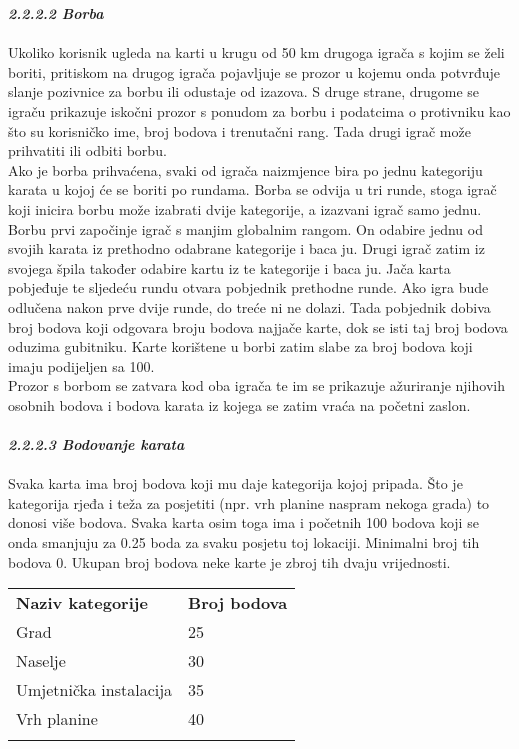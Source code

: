 		\textbf{\textit{\small2.2.2.2 Borba}}\\ \\
		{ Ukoliko korisnik ugleda na karti u krugu od 50 km drugoga igrača s kojim se želi boriti, pritiskom na drugog igrača pojavljuje se prozor u kojemu onda potvrđuje slanje pozivnice za borbu ili odustaje od izazova. S druge strane, drugome se  igraču prikazuje iskočni prozor s ponudom za borbu i podatcima o protivniku kao što su korisničko ime, broj bodova i trenutačni rang. Tada drugi igrač može prihvatiti ili odbiti borbu. \\ Ako je borba prihvaćena, svaki od igrača naizmjence bira po jednu kategoriju karata u kojoj će se boriti po rundama. Borba se odvija u tri runde, stoga igrač koji inicira borbu može izabrati dvije kategorije, a izazvani igrač samo jednu. Borbu prvi započinje igrač s manjim globalnim rangom. On odabire jednu od svojih karata iz prethodno odabrane kategorije i baca ju. Drugi igrač zatim iz svojega špila također odabire kartu iz te kategorije i baca ju. Jača karta pobjeđuje te sljedeću rundu otvara pobjednik prethodne runde. Ako igra bude odlučena nakon prve dvije runde, do treće ni ne dolazi. Tada pobjednik dobiva broj bodova koji odgovara broju bodova najjače karte, dok se isti taj broj bodova oduzima gubitniku. Karte korištene u borbi zatim slabe za broj bodova koji imaju podijeljen sa 100.\\ Prozor s borbom se zatvara kod oba igrača te im se prikazuje ažuriranje njihovih osobnih bodova i bodova karata iz kojega se zatim vraća na početni zaslon.} \\ \\
		
		
		\textbf{\textit{\small2.2.2.3 Bodovanje karata}}\\ \\
		{Svaka karta ima broj bodova koji mu daje kategorija kojoj pripada. Što je kategorija rjeđa i teža za posjetiti (npr. vrh planine naspram nekoga grada) to donosi više bodova. Svaka karta osim toga ima i početnih 100 bodova koji se onda smanjuju za 0.25 boda za svaku posjetu toj lokaciji. Minimalni broj tih bodova 0. Ukupan broj bodova neke karte je zbroj tih dvaju vrijednosti.\\ }
		
		
		\begin{tabular}{ll}
			\textbf{Naziv kategorije} & \textbf{Broj bodova} \\
			Grad                      & 25                   \\
			Naselje                   & 30                   \\
			Umjetnička instalacija    & 35                   \\
			Vrh planine               & 40                   \\
				&                     
		\end{tabular}
	
